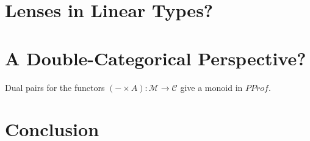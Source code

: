 \documentclass[11pt,a4paper]{article}
\theoremstyle{plain}
\theoremstyle{definition}
\newcommand{\C}{\mathscr{C}}
\newcommand{\M}{\mathscr{M}}
\begin{document}
\section{Lenses in Linear Types?}

\section{A Double-Categorical Perspective?}

Dual pairs for the functors $(- \times A) : \M \to \C$ give a monoid in $PProf$.


\section{Conclusion}



\end{document}
